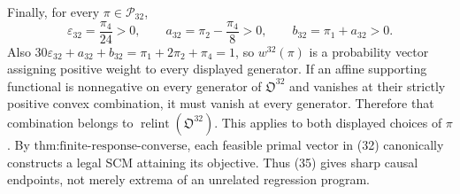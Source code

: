 Finally, for every \(\pi\in\mathcal P_{32}\),
\[
\varepsilon_{32}=\frac{\pi_4}{24}>0,
\qquad
a_{32}=\pi_2-\frac{\pi_4}{8}>0,
\qquad
b_{32}=\pi_1+a_{32}>0.
\tag{36}
\]
Also \(30\varepsilon_{32}+a_{32}+b_{32}=\pi_1+2\pi_2+\pi_4=1\), so \(w^{32}(\pi)\) is a probability vector assigning positive weight to every displayed generator.  If an affine supporting functional is nonnegative on every generator of \(\mathfrak O^{32}\) and vanishes at their strictly positive convex combination, it must vanish at every generator.  Therefore that combination belongs to \(\operatorname{relint}(\mathfrak O^{32})\).  This applies to both displayed choices of \(\pi\).  By \(\text{thm:finite-response-converse}\), each feasible primal vector in (32) canonically constructs a legal SCM attaining its objective.  Thus (35) gives sharp causal endpoints, not merely extrema of an unrelated regression program.